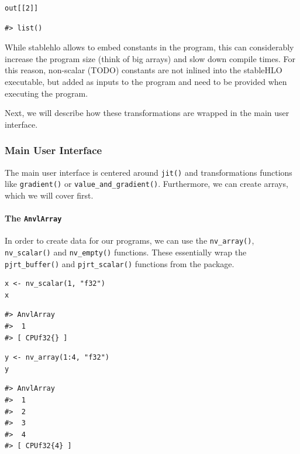 \begin{verbatim}
out[[2]]
\end{verbatim}

\begin{verbatim}
#> list()
\end{verbatim}

While stablehlo allows to embed constants in the program, this can considerably increase the program size (think of big arrays) and slow down compile times.
For this reason, non-scalar (TODO) constants are not inlined into the stableHLO executable, but added as inputs to the program and need to be provided when executing the program.

Next, we will describe how these transformations are wrapped in the main user interface.

\subsubsection{Main User Interface}\label{main-user-interface}

The main user interface is centered around \texttt{jit()} and transformations functions like \texttt{gradient()} or \texttt{value\_and\_gradient()}.
Furthermore, we can create arrays, which we will cover first.

\paragraph{\texorpdfstring{The \texttt{AnvlArray}}{The AnvlArray}}\label{the-anvlarray}

In order to create data for our programs, we can use the \texttt{nv\_array()}, \texttt{nv\_scalar()} and \texttt{nv\_empty()} functions.
These essentially wrap the \texttt{pjrt\_buffer()} and \texttt{pjrt\_scalar()} functions from the  package.

\begin{verbatim}
x <- nv_scalar(1, "f32")
x
\end{verbatim}

\begin{verbatim}
#> AnvlArray
#>  1
#> [ CPUf32{} ]
\end{verbatim}

\begin{verbatim}
y <- nv_array(1:4, "f32")
y
\end{verbatim}

\begin{verbatim}
#> AnvlArray
#>  1
#>  2
#>  3
#>  4
#> [ CPUf32{4} ]
\end{verbatim}

